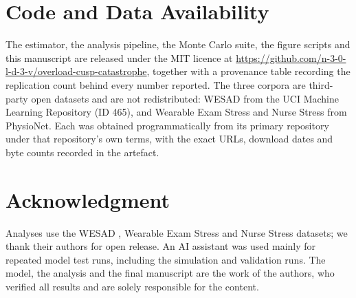 \documentclass[conference]{IEEEtran}
\begin{document}
\section*{Code and Data Availability}
The estimator, the analysis pipeline, the Monte Carlo suite, the figure scripts
and this manuscript are released under the MIT licence at
\url{https://github.com/n-3-0-l-d-3-v/overload-cusp-catastrophe}, together with
a provenance table recording the replication count behind every number
reported. The three corpora are third-party open datasets and are not
redistributed: WESAD from the UCI Machine Learning Repository (ID 465), and
Wearable Exam Stress and Nurse Stress from PhysioNet. Each was obtained
programmatically from its primary repository under that repository's own terms,
with the exact URLs, download dates and byte counts recorded in the artefact.

\section*{Acknowledgment}
Analyses use the WESAD \cite{schmidt2018wesad}, Wearable Exam Stress
\cite{amin2022exam} and Nurse Stress \cite{hosseini2022nurse} datasets; we
thank their authors for open release. An AI assistant was used mainly for
repeated model test runs, including the simulation and validation runs. The model, the analysis and the
final manuscript are the work of the authors, who verified all results and are
solely responsible for the content.



\end{document}
